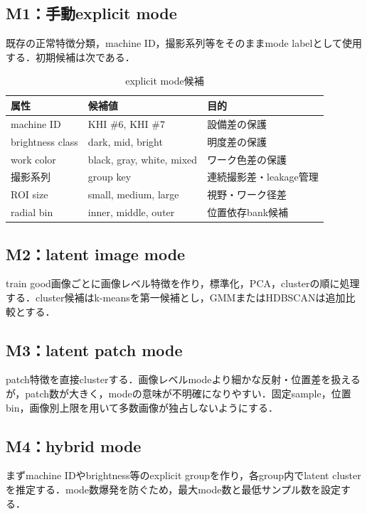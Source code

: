 \documentclass[a4paper,11pt]{ltjsarticle}
\begin{document}
\subsection{M1：手動explicit mode}
既存の正常特徴分類，machine ID，撮影系列等をそのままmode labelとして使用する．初期候補は次である．
\begin{table}[H]
\centering
\caption{explicit mode候補}
\begin{tabularx}{\linewidth}{L{35mm}L{52mm}Y}
\toprule
属性 & 候補値 & 目的 \\
\midrule
machine ID & KHI \#6, KHI \#7 & 設備差の保護 \\
brightness class & dark, mid, bright & 明度差の保護 \\
work color & black, gray, white, mixed & ワーク色差の保護 \\
撮影系列 & group key & 連続撮影差・leakage管理 \\
ROI size & small, medium, large & 視野・ワーク径差 \\
radial bin & inner, middle, outer & 位置依存bank候補 \\
\bottomrule
\end{tabularx}
\end{table}

\subsection{M2：latent image mode}
train good画像ごとに画像レベル特徴を作り，標準化，PCA，clusterの順に処理する．cluster候補はk-meansを第一候補とし，GMMまたはHDBSCANは追加比較とする．

\subsection{M3：latent patch mode}
patch特徴を直接clusterする．画像レベルmodeより細かな反射・位置差を扱えるが，patch数が大きく，modeの意味が不明確になりやすい．固定sample，位置bin，画像別上限を用いて多数画像が独占しないようにする．

\subsection{M4：hybrid mode}
まずmachine IDやbrightness等のexplicit groupを作り，各group内でlatent clusterを推定する．mode数爆発を防ぐため，最大mode数と最低サンプル数を設定する．
\end{document}
